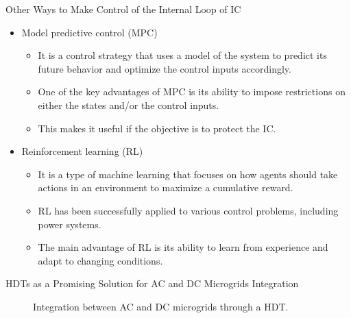 \begin{frame}{Other Ways to Make Control of the Internal Loop of IC}
    \begin{itemize}
        \item Model predictive control (MPC)
        \begin{itemize}
            \item It is a control strategy that uses a model of the system to predict its future behavior and optimize the control inputs accordingly.
            \item One of the key advantages of MPC is its ability to impose restrictions on either the states and/or the control inputs.
            \item This makes it useful if the objective is to protect the IC.
        \end{itemize}
        \item Reinforcement learning (RL)
        \begin{itemize}
            \item It is a type of machine learning that focuses on how agents should take actions in an environment to maximize a cumulative reward.
            \item RL has been successfully applied to various control problems, including power systems.
            \item The main advantage of RL is its ability to learn from experience and adapt to changing conditions.
        \end{itemize}
    \end{itemize}
\end{frame}

\begin{frame}{HDTs as a Promising Solution for AC and DC Microgrids Integration}
    \begin{figure}
        \centering
        \resizebox{!}{5.3cm}{}
        \caption{Integration between AC and DC microgrids through a HDT.}
    \end{figure}
\end{frame}

\maketitle
